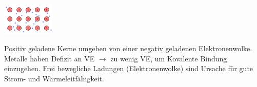 \begin{minipage}{25mm}
    \includegraphics[width=2.5cm]{src/3_Chemical_bondings/images/Metallische Bindung.png}
\end{minipage}
\begin{minipage}{42mm}
    Positiv geladene Kerne umgeben von einer negativ geladenen Elektronenwolke. Metalle haben
    Defizit an VE $\rightarrow$ zu wenig VE, um Kovalente Bindung einzugehen. Frei bewegliche Ladungen 
    (Elektronenwolke) sind Ursache für gute Strom- und Wärmeleitfähigkeit.
\end{minipage}